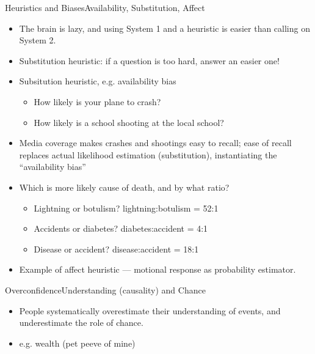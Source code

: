 \documentclass{beamer}
\begin{document}
\begin{frame}{Heuristics and Biases}{Availability, Substitution, Affect}
\begin{itemize}
\addtolength{\itemsep}{0.5\baselineskip}
\item The brain is lazy, and using System 1 and a heuristic is easier than calling on System 2.
\item Substitution heuristic: if a question is too hard, answer an easier one!
\item Subsitution heuristic, e.g. availability bias
    \begin{itemize}
    \addtolength{\itemsep}{0.5\baselineskip}
    \item How likely is your plane to crash?
    \item How likely is a school shooting at the local school?
    \end{itemize}
\item Media coverage makes crashes and shootings easy to recall; ease of recall replaces actual likelihood estimation (substitution), instantiating the ``availability bias'' 
\item Which is more likely cause of death, and by what ratio? 
    \begin{itemize}
    \addtolength{\itemsep}{0.5\baselineskip}
    \item Lightning or botulism? lightning:botulism = 52:1
    \item Accidents or diabetes? diabetes:accident = 4:1
    \item Disease or accident? disease:accident = 18:1
    \end{itemize}
\item Example of affect heuristic --- motional response as probability estimator.
\end{itemize}

\end{frame}

\begin{frame}{Overconfidence}{Understanding (causality) and Chance}
\begin{itemize}
\addtolength{\itemsep}{0.5\baselineskip}
\item People systematically overestimate their understanding of events, and underestimate the role of chance.
\item e.g. wealth (pet peeve of mine)
\end{itemize}

\end{frame}
\end{document}
